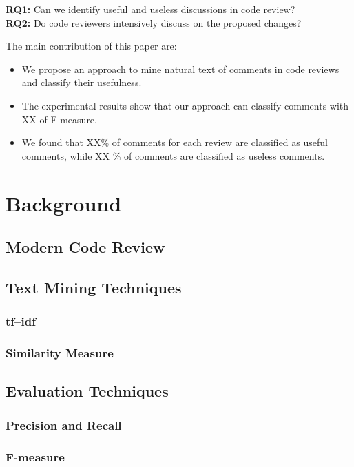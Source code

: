 \documentclass[conference]{IEEEtran}
\begin{document}
\noindent \textbf{RQ1:} Can we identify useful and useless discussions in code review?\\
\noindent \textbf{RQ2:} Do code reviewers intensively discuss on the proposed changes?

\noindent The main contribution of this paper are:
\begin{itemize}
\item We propose an approach to mine natural text of comments in code reviews and classify their usefulness.
\item The experimental results show that our approach can classify comments with XX of F-measure.
\item We found that XX\% of comments for each review are classified as useful comments, while XX \% of comments are classified as useless comments.
\end{itemize} 



\section{Background}
\subsection{Modern Code Review}
\subsection{Text Mining Techniques}
\subsubsection{tf--idf}
\subsubsection{Similarity Measure}
\subsection{Evaluation Techniques}
\subsubsection{Precision and Recall}
\subsubsection{F-measure}
\end{document}
